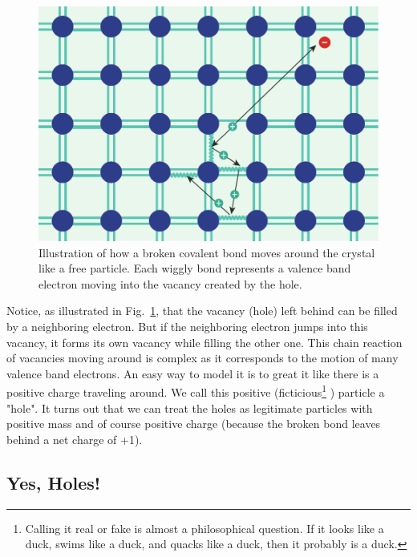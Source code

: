 \begin{figure}[tb]
\begin{center}
\includegraphics[width=.5\columnwidth]{silicon_hole}
\end{center}
\caption{Illustration of how a broken covalent bond moves around the crystal like a free particle.   Each wiggly bond represents a valence band electron moving into the vacancy created by the hole.} \label{fig:silicon_hole}
\end{figure}


Notice, as illustrated in Fig.~\ref{fig:silicon_hole},  that the vacancy (hole) left behind can be filled by a neighboring electron.   But if the neighboring electron jumps into this vacancy, it forms its own vacancy while filling the other one.  This chain reaction of vacancies moving around is complex as it corresponds to the motion of many valence band electrons.  An easy way to model it is to great it like there is a positive charge traveling around.  We call this positive (ficticious\footnote{Calling it real or fake is almost a philosophical question.  If it looks like a duck, swims like a duck, and quacks like a duck, then it probably is a duck.} ) particle a "hole".  It turns out that we can treat the holes as legitimate particles with positive mass and of course positive charge (because the broken bond leaves behind a net charge of +1).




\subsection{Yes, Holes!}


